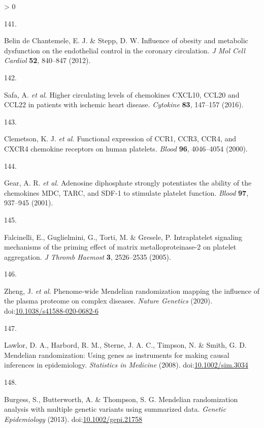\documentclass[11pt,twoside]{bristolthesis}
\newlength{\cslhangindent}
\newlength{\csllabelwidth}
\newenvironment{CSLReferences}[2] %
 {%
  \setlength{\parindent}{0pt}
  \ifodd #1 \everypar{\setlength{\hangindent}{\cslhangindent}}\ignorespaces\fi
  \ifnum #2 > 0
  \setlength{\parskip}{#2\baselineskip}
  \fi
 }%
 {}
\newcommand{\CSLLeftMargin}[1]{\parbox[t]{\csllabelwidth}{#1}}
\newcommand{\CSLRightInline}[1]{\parbox[t]{\linewidth - \csllabelwidth}{#1}\break}
\begin{document}
\begin{CSLReferences}{0}{0}
\leavevmode\hypertarget{ref-BelindeChantemele2012a}{}%
\CSLLeftMargin{141. }
\CSLRightInline{Belin de Chantemele, E. J. \& Stepp, D. W. {Influence of obesity and metabolic dysfunction on the endothelial control in the coronary circulation}. \emph{J Mol Cell Cardiol} \textbf{52}, 840--847 (2012).}

\leavevmode\hypertarget{ref-Safa2016}{}%
\CSLLeftMargin{142. }
\CSLRightInline{Safa, A. \emph{et al.} {Higher circulating levels of chemokines CXCL10, CCL20 and CCL22 in patients with ischemic heart disease}. \emph{Cytokine} \textbf{83}, 147--157 (2016).}

\leavevmode\hypertarget{ref-Clemetson2000}{}%
\CSLLeftMargin{143. }
\CSLRightInline{Clemetson, K. J. \emph{et al.} {Functional expression of CCR1, CCR3, CCR4, and CXCR4 chemokine receptors on human platelets}. \emph{Blood} \textbf{96}, 4046--4054 (2000).}

\leavevmode\hypertarget{ref-Gear2001}{}%
\CSLLeftMargin{144. }
\CSLRightInline{Gear, A. R. \emph{et al.} {Adenosine diphosphate strongly potentiates the ability of the chemokines MDC, TARC, and SDF-1 to stimulate platelet function}. \emph{Blood} \textbf{97}, 937--945 (2001).}

\leavevmode\hypertarget{ref-Falcinelli2005}{}%
\CSLLeftMargin{145. }
\CSLRightInline{Falcinelli, E., Guglielmini, G., Torti, M. \& Gresele, P. {Intraplatelet signaling mechanisms of the priming effect of matrix metalloproteinase-2 on platelet aggregation}. \emph{J Thromb Haemost} \textbf{3}, 2526--2535 (2005).}

\leavevmode\hypertarget{ref-Zheng2020}{}%
\CSLLeftMargin{146. }
\CSLRightInline{Zheng, J. \emph{et al.} {Phenome-wide Mendelian randomization mapping the influence of the plasma proteome on complex diseases}. \emph{Nature Genetics} (2020). doi:\href{https://doi.org/10.1038/s41588-020-0682-6}{10.1038/s41588-020-0682-6}}

\leavevmode\hypertarget{ref-Lawlor2008}{}%
\CSLLeftMargin{147. }
\CSLRightInline{Lawlor, D. A., Harbord, R. M., Sterne, J. A. C., Timpson, N. \& Smith, G. D. {Mendelian randomization: Using genes as instruments for making causal inferences in epidemiology}. \emph{Statistics in Medicine} (2008). doi:\href{https://doi.org/10.1002/sim.3034}{10.1002/sim.3034}}

\leavevmode\hypertarget{ref-Burgess2013}{}%
\CSLLeftMargin{148. }
\CSLRightInline{Burgess, S., Butterworth, A. \& Thompson, S. G. {Mendelian randomization analysis with multiple genetic variants using summarized data}. \emph{Genetic Epidemiology} (2013). doi:\href{https://doi.org/10.1002/gepi.21758}{10.1002/gepi.21758}}


\end{CSLReferences}
\end{document}
